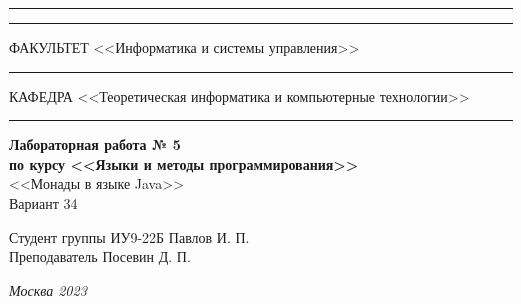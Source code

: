 \documentclass[a4paper, 14pt]{extarticle}
\begin{document}
\begin{titlepage}
\vspace{-25pt}
\hspace{-35pt}\rule{\textwidth}{2.3pt}

\vspace*{-20.3pt}
\hspace{-35pt}\rule{\textwidth}{0.4pt}

\vspace{1.5ex}
\hspace{-35pt} \noindent \small ФАКУЛЬТЕТ\hspace{80pt} <<Информатика и системы управления>>

\vspace*{-16pt}
\hspace{47pt}\rule{0.83\textwidth}{0.4pt}

\vspace{0.5ex}
\hspace{-35pt} \noindent \small КАФЕДРА\hspace{50pt} <<Теоретическая информатика и компьютерные технологии>>

\vspace*{-16pt}
\hspace{30pt}\rule{0.866\textwidth}{0.4pt}
  
\vspace{11em}

\begin{center}
\Large {\bf Лабораторная работа № 5} \\ 
\large {\bf по курсу <<Языки и методы программирования>>} \\
\large <<Монады в языке Java>> \\
\large Вариант 34
\end{center}\normalsize

\vspace{8em}


\begin{flushright}
  {Студент группы ИУ9-22Б Павлов И. П. \hspace*{15pt}\\ 
  \vspace{2ex}
  Преподаватель Посевин Д. П.\hspace*{15pt}}
\end{flushright}

\bigskip

\vfill
 

\begin{center}
\textsl{Москва 2023}
\end{center}
\end{titlepage}
\end{document}
